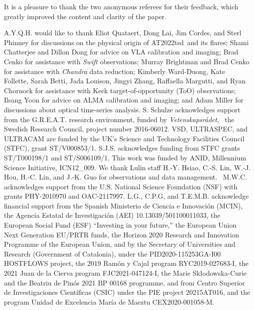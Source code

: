 \documentclass{nature_plusfigure}
\newcommand{\at}{AT2022tsd}
\begin{document}
\begin{addendum}

\item It is a pleasure to thank the two anonymous referees for their feedback, which greatly improved the content and clarity of the paper.

A.Y.Q.H. would like to thank Eliot Quataert, Dong Lai, Jim Cordes, and Sterl Phinney for discussions on the physical origin of \at\ and its flares; Shami Chatterjee and Dillon Dong for advice on VLA calibration and imaging; Brad Cenko for assistance with {\it Swift} observations; Murray Brightman and Brad Cenko for assistance with {\it Chandra} data reduction; Kimberly Ward-Duong, Kate Follette, Sarah Betti, Jada Louison, Jingyi Zhang, Raffaella Margutti, and Ryan Chornock for assistance with Keck target-of-opportunity (ToO) observations; Ilsang Yoon for advice on ALMA calibration and imaging; and Adam Miller for discussions about optical time-series analysis.
S. Schulze acknowledges support from the G.R.E.A.T. research environment, funded by {\em Vetenskapsr\aa det},  the Swedish Research Council, project number 2016-06012.
VSD, ULTRASPEC, and ULTRACAM are funded by the UK’s Science and Technology Facilities Council (STFC), grant ST/V000853/1.
S.J.S. acknowledges funding from STFC grants ST/T000198/1 and ST/S006109/1.
This work was funded by ANID, Millennium Science Initiative, ICN12\_009.
We thank Lulin staff H.-Y. Hsiao, C.-S. Lin, W.-J. Hou, H.-C. Lin, and J.-K. Guo for observations and data management. 
M.W.C. acknowledges support from the U.S. National Science Foundation (NSF) with grants PHY-2010970 and OAC-2117997.
L.G., C.P.G, and T.E.M.B. acknowledge financial support from the Spanish Ministerio de Ciencia e Innovaci\'on (MCIN), the Agencia Estatal de Investigaci\'on (AEI) 10.13039/501100011033, the European Social Fund (ESF) ``Investing in your future,” the European Union Next Generation EU/PRTR funds, the Horizon 2020 Research and Innovation Programme of the European Union, and by the Secretary of Universities and Research (Government of Catalonia), under the PID2020-115253GA-I00 HOSTFLOWS project, the 2019 Ram\'on y Cajal program RYC2019-027683-I, the 2021 Juan de la Cierva program FJC2021-047124-I, the Marie Skłodowska-Curie and the Beatriu de Pin\'os 2021 BP 00168 programme, and from Centro Superior de Investigaciones Cient\'ificas (CSIC) under the PIE project 20215AT016, and the program Unidad de Excelencia Mar\'ia de Maeztu CEX2020-001058-M.

\end{addendum}
\end{document}
